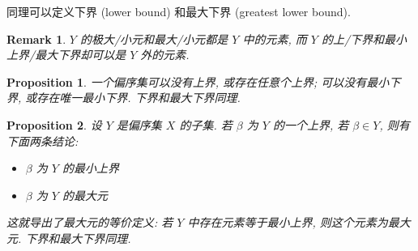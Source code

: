 \documentclass[UTF8]{ctexart}
\theoremstyle{mystyle}
\newtheorem{proposition}{Proposition}[section]
\theoremstyle{myremark}
\newtheorem*{remark}{Remark}
\theoremstyle{plain}
\begin{document}
同理可以定义下界 (lower bound) 和最大下界 (greatest lower bound).

\begin{remark}
    $ Y $ 的极大/小元和最大/小元都是 $ Y $ 中的元素, 而 $ Y $ 的上/下界和最小上界/最大下界却可以是 $ Y $ 外的元素.
\end{remark}

\begin{proposition}
    一个偏序集可以没有上界, 或存在任意个上界; 可以没有最小下界, 或存在唯一最小下界. 下界和最大下界同理.
\end{proposition}

\begin{proposition}
    设 $ Y $ 是偏序集 $ X $ 的子集. 若 $ \beta $ 为 $ Y $ 的一个上界, 若 $ \beta \in Y $, 则有下面两条结论:
    \begin{itemize}
        \item $ \beta $ 为 $ Y $ 的最小上界
        \item $ \beta $ 为 $ Y $ 的最大元
    \end{itemize}

    这就导出了最大元的等价定义: 若 $ Y $ 中存在元素等于最小上界, 则这个元素为最大元. 下界和最大下界同理.
\end{proposition}
\end{document}
